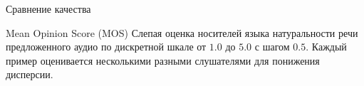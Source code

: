 \begin{frame}{Сравнение качества}
\begin{block}{Mean Opinion Score (MOS)}
    Слепая оценка носителей языка натуральности речи предложенного аудио по дискретной шкале от $1.0$ до $5.0$ с шагом $0.5$. Каждый пример оценивается несколькими разными слушателями для понижения дисперсии.
\end{block}
\begin{table}[!ht]
\centering
{}
\caption{Оценки MOS с использованием вокодера WaveGlow и $95\%$ доверительным интервалом. Оценки усреднялись по 100 примерам, каждый из которых был оценен не менее 10 раз. Как можно заметить, \textbf{качество TalkNet сравнимо с Tacotron 2} -- авторегресионным подходом, считающихся одним из лучших на сегодняшний момент.}
\end{table}
\end{frame}

